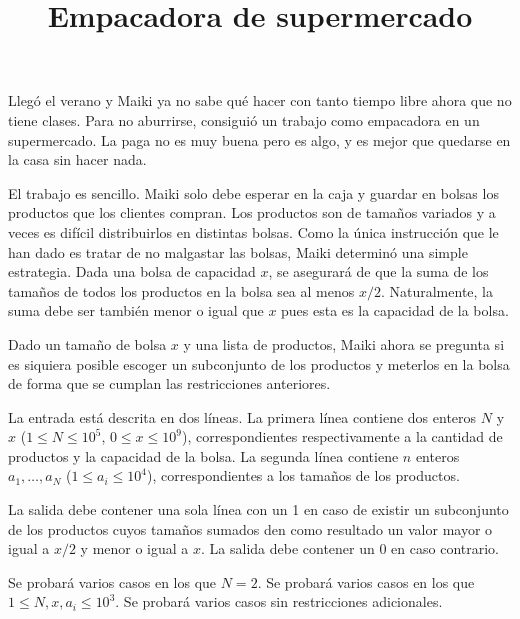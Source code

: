 \documentclass{oci}
\title{Empacadora de supermercado}
\begin{document}
\begin{problemDescription}
Llegó el verano y Maiki ya no sabe qué hacer con tanto tiempo libre ahora que no tiene clases.
Para no aburrirse, consiguió un trabajo como empacadora en un supermercado.
La paga no es muy buena pero es algo, y es mejor que quedarse en la casa sin hacer nada.

El trabajo es sencillo.
Maiki solo debe esperar en la caja y guardar en bolsas los productos que los clientes compran.
Los productos son de tamaños variados y a veces es difícil distribuirlos
en distintas bolsas.
Como la única instrucción que le han dado es tratar de no malgastar las bolsas,
Maiki determinó una simple estrategia.
Dada una bolsa de capacidad $x$, se asegurará de que la suma de los tamaños de todos los productos
en la bolsa sea al menos $x/2$.
Naturalmente, la suma debe ser también menor o igual que $x$ pues esta es la capacidad
de la bolsa.

Dado un tamaño de bolsa $x$ y una lista de productos, Maiki ahora se pregunta si es siquiera
posible escoger un subconjunto de los productos y meterlos en la bolsa de forma que se cumplan
las restricciones anteriores.

\end{problemDescription}

\begin{inputDescription}
La entrada está descrita en dos líneas.
La primera línea contiene dos enteros $N$ y $x$ ($1\leq N\leq 10^5$, $0 \leq x \leq 10^9$),
correspondientes respectivamente a la cantidad de productos y la capacidad de la bolsa.
La segunda línea contiene $n$ enteros $a_1,\ldots, a_N$ ($1\leq a_i\leq 10^4$), correspondientes
a los tamaños de los productos.
\end{inputDescription}

\begin{outputDescription}
La salida debe contener una sola línea con un 1 en caso de existir un subconjunto de los productos
cuyos tamaños sumados den como resultado un valor mayor o igual a $x/2$ y menor o igual a $x$.
La salida debe contener un 0 en caso contrario.
\end{outputDescription}

\begin{scoreDescription}
  Se probará varios casos en los que $N = 2$.
  Se probará varios casos en los que $1 \leq N, x, a_i \leq 10^3$.
  Se probará varios casos sin restricciones adicionales.
\end{scoreDescription}

\begin{sampleDescription}
\end{sampleDescription}
\end{document}
